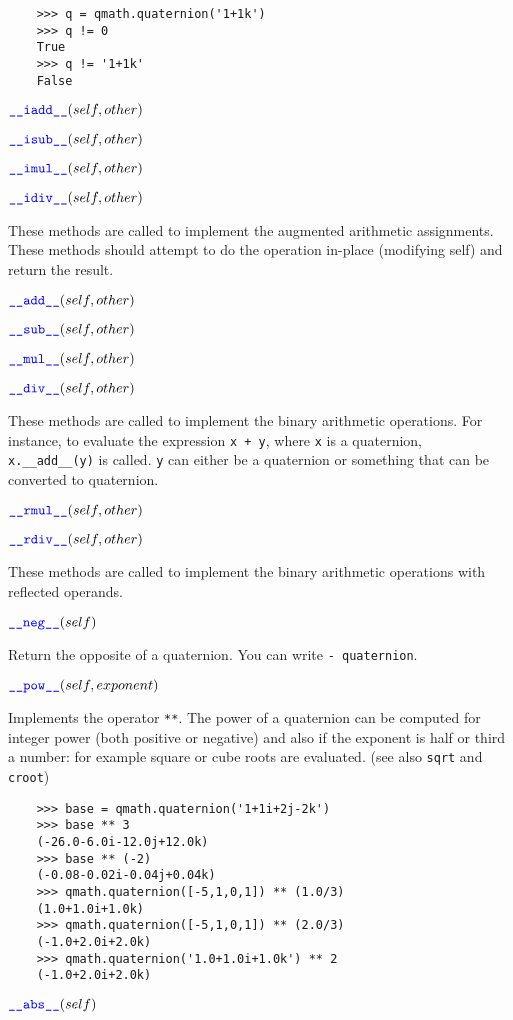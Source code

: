 \documentclass[11pt]{paper}
\begin{document}
\begin{verbatim}
    >>> q = qmath.quaternion('1+1k')
    >>> q != 0
    True
    >>> q != '1+1k'
    False
\end{verbatim}

\medskip
\noindent $\textcolor{blue}{\texttt{\_\_\mbox{iadd}\_\_}}(self,other)$

\noindent $\textcolor{blue}{\texttt{\_\_\mbox{isub}\_\_}}(self,other)$

\noindent $\textcolor{blue}{\texttt{\_\_\mbox{imul}\_\_}}(self,other)$ 

\noindent $\textcolor{blue}{\texttt{\_\_\mbox{idiv}\_\_}}(self,other)$

These methods are called to implement the augmented arithmetic assignments. These methods should attempt to do the operation in-place (modifying self) and return the result.


\medskip
\noindent $\textcolor{blue}{\texttt{\_\_\mbox{add}\_\_}}(self,other)$

\noindent $\textcolor{blue}{\texttt{\_\_\mbox{sub}\_\_}}(self,other)$

\noindent $\textcolor{blue}{\texttt{\_\_\mbox{mul}\_\_}}(self,other)$

\noindent $\textcolor{blue}{\texttt{\_\_\mbox{div}\_\_}}(self,other)$

These methods are called to implement the binary arithmetic operations. For instance, to evaluate the expression \texttt{x + y}, where \texttt{x} is a quaternion, \texttt{x.\_\_\mbox{add}\_\_(y)} is called. \texttt{y} can either be a quaternion or something that can be converted to quaternion.


\medskip
\noindent $\textcolor{blue}{\texttt{\_\_\mbox{rmul}\_\_}}(self,other)$ 

\noindent $\textcolor{blue}{\texttt{\_\_\mbox{rdiv}\_\_}}(self,other)$

These methods are called to implement the binary arithmetic operations with reflected operands.


\medskip        
\noindent $\textcolor{blue}{\texttt{\_\_\mbox{neg}\_\_}}(self)$

Return the opposite of a quaternion. You can write \texttt{- quaternion}.


\medskip
\noindent $\textcolor{blue}{\texttt{\_\_\mbox{pow}\_\_}}(self,exponent)$

Implements the operator \texttt{**}. The power of a quaternion can be computed for integer power (both positive or negative) and also if the exponent is half or third a number: for example square or cube roots are evaluated. (see also \texttt{sqrt} and \texttt{croot})
\begin{verbatim}
    >>> base = qmath.quaternion('1+1i+2j-2k')
    >>> base ** 3
    (-26.0-6.0i-12.0j+12.0k)
    >>> base ** (-2)
    (-0.08-0.02i-0.04j+0.04k)
    >>> qmath.quaternion([-5,1,0,1]) ** (1.0/3)
    (1.0+1.0i+1.0k)
    >>> qmath.quaternion([-5,1,0,1]) ** (2.0/3)
    (-1.0+2.0i+2.0k)
    >>> qmath.quaternion('1.0+1.0i+1.0k') ** 2
    (-1.0+2.0i+2.0k)
\end{verbatim}
\medskip
\noindent $\textcolor{blue}{\texttt{\_\_\mbox{abs}\_\_}}(self)$ 
\end{document}
